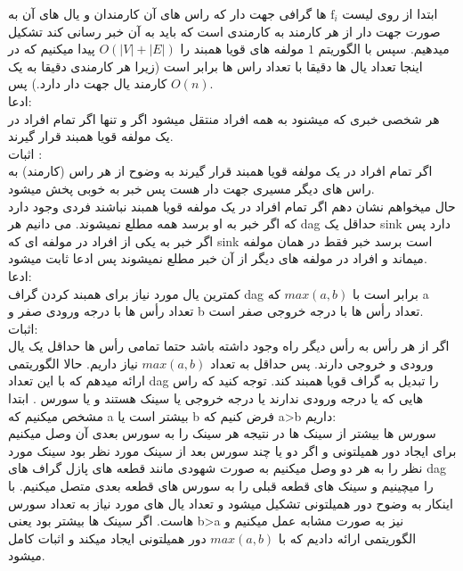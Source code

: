 \problem{}
ابتدا از روی لیست 
$\text{f}_i$
 ها گرافی جهت دار که راس های آن
کارمندان و یال های آن به صورت جهت دار از هر کارمند به کارمندی است که باید
به آن خبر رسانی کند تشکیل میدهیم.
سپس با الگوریتم $1$ مولفه های قویا همبند را $O(|V|+|E|)$ پیدا میکنیم که در اینجا
تعداد یال ها دقیقا با تعداد راس ها برابر است (زیرا هر کارمندی دقیقا به یک کارمند یال جهت دار دارد.)
پس $O(n)$.\\
ادعا:\\
هر شخصی خبری که میشنود به همه افراد منتقل میشود اگر و تنها اگر تمام افراد در یک مولفه
قویا همبند قرار گیرند.\\
اثبات :\\
اگر تمام افراد در یک مولفه قویا همبند قرار گیرند به وضوح از هر راس (کارمند)
به راس های دیگر مسیری جهت دار هست پس خبر به خوبی پخش میشود.\\
حال میخواهم نشان دهم اگر تمام افراد در یک مولفه قویا همبند نباشند 
فردی وجود دارد که اگر خبر به او برسد همه مطلع نمیشوند.
می دانیم هر dag حداقل یک sink دارد پس
اگر خبر به یکی از افراد در مولفه ای که sink است برسد
خبر فقط در همان مولفه میماند و افراد در مولفه های دیگر از آن خبر
مطلع نمیشوند پس ادعا ثابت میشود.\\
ادعا:\\
کمترین یال مورد نیاز برای همبند کردن گراف dag
برابر است با $max(a,b)$ که a تعداد رأس ها
با درجه ورودی صفر و b تعداد رأس ها با درجه خروجی صفر است.\\
اثبات:\\
اگر از هر رأس به رأس دیگر راه وجود داشته باشد حتما تمامی رأس ها
حداقل یک یال ورودی و خروجی دارند.
پس حداقل به تعداد $max(a,b)$ نیاز داریم.
حالا الگوریتمی ارائه میدهم که با این تعداد 
dag را تبدیل به گراف قویا همبند کند.
توجه کنید که راس هایی که یا درجه ورودی ندارند یا درجه خروجی یا 
سینک هستند و یا سورس .
ابتدا مشخص میکنیم که a بیشتر است یا b 
فرض کنیم که a>b داریم:\\
سورس ها بیشتر از سینک ها در نتیجه هر سینک را به سورس بعدی آن وصل میکنیم
برای ایجاد دور همیلتونی و اگر دو یا چند سورس بعد از سینک مورد نظر بود
سینک مورد نظر را به هر دو وصل میکنیم
به صورت شهودی مانند قطعه های پازل گراف های dag را میچینیم و سینک های قطعه قبلی
را به سورس های قطعه بعدی متصل میکنیم.
با اینکار به وضوح دور همیلتونی تشکیل میشود و تعداد یال های مورد نیاز به تعداد
سورس هاست.
اگر سینک ها بیشتر بود یعنی b>a نیز به صورت مشابه عمل میکنیم و الگوریتمی ارائه دادیم که
با $max(a,b)$ دور همیلتونی ایجاد میکند و اثبات کامل میشود.